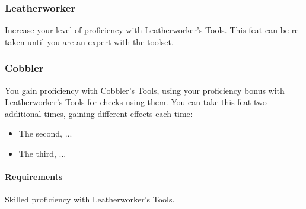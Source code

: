 \subsubsection{Leatherworker} \label{feat::leatherworker}
    Increase your level of proficiency with Leatherworker's Tools.
    This feat can be re-taken until you are an expert with the toolset.
\subsubsection{Cobbler} \label{feat::cobbler}
    You gain proficiency with Cobbler's Tools, using your proficiency bonus with Leatherworker's Tools for checks using them.
    You can take this feat two additional times, gaining different effects each time:
    \begin{itemize}
        \item The second, ...
        \item The third, ...
    \end{itemize}
    \paragraph{Requirements} Skilled proficiency with Leatherworker's Tools.

